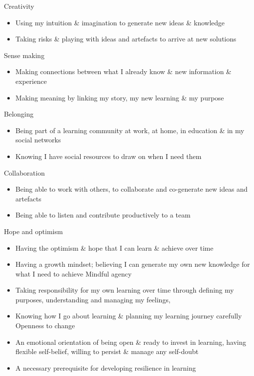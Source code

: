 \documentclass[]{book}
\providecommand{\tightlist}{%
  \setlength{\itemsep}{0pt}\setlength{\parskip}{0pt}}
\theoremstyle{definition}
\theoremstyle{definition}
\theoremstyle{remark}
\begin{document}
Creativity

\begin{itemize}
\tightlist
\item
  Using my intuition \& imagination to generate new ideas \& knowledge
\item
  Taking risks \& playing with ideas and artefacts to arrive at new
  solutions
\end{itemize}

Sense making

\begin{itemize}
\tightlist
\item
  Making connections between what I already know \& new information \&
  experience
\item
  Making meaning by linking my story, my new learning \& my purpose
\end{itemize}

Belonging

\begin{itemize}
\tightlist
\item
  Being part of a learning community at work, at home, in education \&
  in my social networks
\item
  Knowing I have social resources to draw on when I need them
\end{itemize}

Collaboration

\begin{itemize}
\tightlist
\item
  Being able to work with others, to collaborate and co-generate new
  ideas and artefacts
\item
  Being able to listen and contribute productively to a team
\end{itemize}

Hope and optimism

\begin{itemize}
\tightlist
\item
  Having the optimism \& hope that I can learn \& achieve over time
\item
  Having a growth mindset; believing I can generate my own new knowledge
  for what I need to achieve Mindful agency
\item
  Taking responsibility for my own learning over time through defining
  my purposes, understanding and managing my feelings,
\item
  Knowing how I go about learning \& planning my learning journey
  carefully Openness to change
\item
  An emotional orientation of being open \& ready to invest in learning,
  having flexible self-belief, willing to persist \& manage any
  self-doubt
\item
  A necessary prerequisite for developing resilience in learning
\end{itemize}
\end{document}
